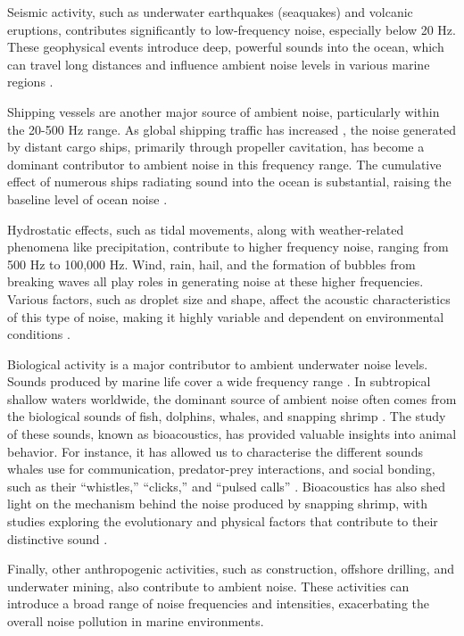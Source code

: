 Seismic activity, such as underwater earthquakes (seaquakes) and volcanic eruptions, contributes significantly to low-frequency noise, especially below 20 Hz. These geophysical events introduce deep, powerful sounds into the ocean, which can travel long distances and influence ambient noise levels in various marine regions \cite{knowlton_what_nodate}.

Shipping vessels are another major source of ambient noise, particularly within the 20-500 Hz range. As global shipping traffic has increased \cite{andrew_ocean_2002}, the noise generated by distant cargo ships, primarily through propeller cavitation, has become a dominant contributor to ambient noise in this frequency range. The cumulative effect of numerous ships radiating sound into the ocean is substantial, raising the baseline level of ocean noise \cite{ross_mechanics_1976}.

Hydrostatic effects, such as tidal movements, along with weather-related phenomena like precipitation, contribute to higher frequency noise, ranging from 500 Hz to 100,000 Hz. Wind, rain, hail, and the formation of bubbles from breaking waves all play roles in generating noise at these higher frequencies. Various factors, such as droplet size and shape, affect the acoustic characteristics of this type of noise, making it highly variable and dependent on environmental conditions \cite{medwin_bubble_1989, franz_splashes_1959, dahl_underwater_2007}.

Biological activity is a major contributor to ambient underwater noise levels. Sounds produced by marine life cover a wide frequency range \cite{bjorno_applied_2017}. In subtropical shallow waters worldwide, the dominant source of ambient noise often comes from the biological sounds of fish, dolphins, whales, and snapping shrimp \cite{cato_ultrasonic_1992}. The study of these sounds, known as bioacoustics, has provided valuable insights into animal behavior. For instance, it has allowed us to characterise the different sounds whales use for communication, predator-prey interactions, and social bonding, such as their ``whistles,'' ``clicks,'' and ``pulsed calls'' \cite{richardson_marine_1995}. Bioacoustics has also shed light on the mechanism behind the noise produced by snapping shrimp, with studies exploring the evolutionary and physical factors that contribute to their distinctive sound \cite{patek_evolutionary_2018, lohse_snapping_2001, ritzmann_snapping_1973}.

Finally, other anthropogenic activities, such as construction, offshore drilling, and underwater mining, also contribute to ambient noise. These activities can introduce a broad range of noise frequencies and intensities, exacerbating the overall noise pollution in marine environments. 

